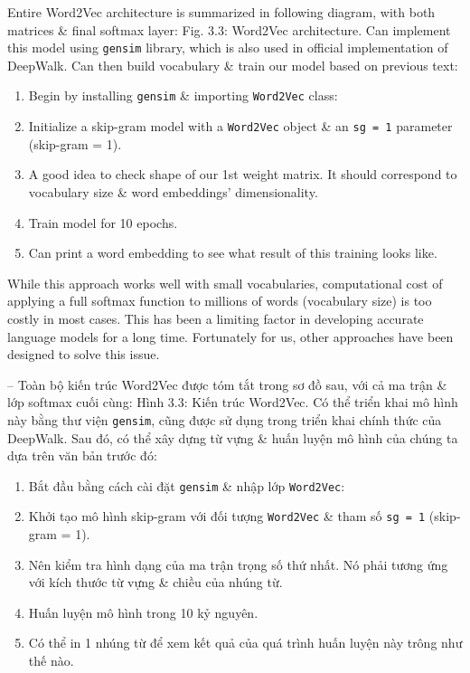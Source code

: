 \documentclass{article}
\begin{document}
\begin{itemize}
\begin{itemize}
\begin{itemize}
            Entire Word2Vec architecture is summarized in following diagram, with both matrices \& final softmax layer: {\sf Fig. 3.3: Word2Vec architecture}. Can implement this model using {\tt gensim} library, which is also used in official implementation of DeepWalk. Can then build vocabulary \& train our model based on previous text:
            \begin{enumerate}
                \item Begin by installing {\tt gensim} \& importing {\tt Word2Vec} class:
                \item Initialize a skip-gram model with a {\tt Word2Vec} object \& an {\tt sg = 1} parameter (skip-gram = 1).
                \item A good idea to check shape of our 1st weight matrix. It should correspond to vocabulary size \& word embeddings' dimensionality.
                \item Train model for 10 epochs.
                \item Can print a word embedding to see what result of this training looks like.
            \end{enumerate}
            While this approach works well with small vocabularies, computational cost of applying a full softmax function to millions of words (vocabulary size) is too costly in most cases. This has been a limiting factor in developing accurate language models for a long time. Fortunately for us, other approaches have been designed to solve this issue.

            -- Toàn bộ kiến trúc Word2Vec được tóm tắt trong sơ đồ sau, với cả ma trận \& lớp softmax cuối cùng: {\sf Hình 3.3: Kiến trúc Word2Vec}. Có thể triển khai mô hình này bằng thư viện {\tt gensim}, cũng được sử dụng trong triển khai chính thức của DeepWalk. Sau đó, có thể xây dựng từ vựng \& huấn luyện mô hình của chúng ta dựa trên văn bản trước đó:
            \begin{enumerate}
                \item Bắt đầu bằng cách cài đặt {\tt gensim} \& nhập lớp {\tt Word2Vec}:
                \item Khởi tạo mô hình skip-gram với đối tượng {\tt Word2Vec} \& tham số {\tt sg = 1} (skip-gram = 1).
                \item Nên kiểm tra hình dạng của ma trận trọng số thứ nhất. Nó phải tương ứng với kích thước từ vựng \& chiều của nhúng từ.
                \item Huấn luyện mô hình trong 10 kỷ nguyên.
                \item Có thể in 1 nhúng từ để xem kết quả của quá trình huấn luyện này trông như thế nào.


\end{enumerate}
\end{itemize}
\end{itemize}
\end{itemize}
\end{document}
